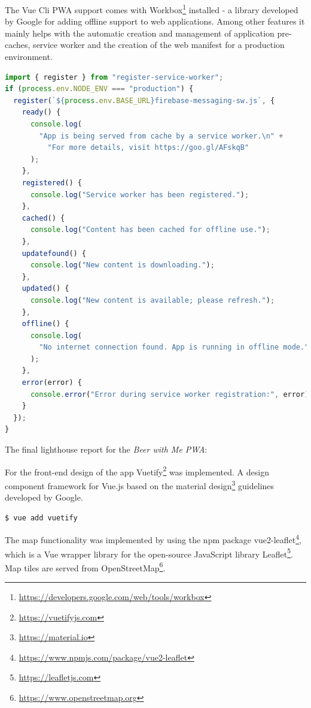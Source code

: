 
The Vue Cli PWA support comes with Workbox\footnote{\url{https://developers.google.com/web/tools/workbox}} installed - a library developed by Google for adding offline support to web applications. Among other features it mainly helps with the automatic creation and management of application pre-caches, service worker and the creation of the web manifest for a production environment.

\begin{lstlisting}[language=JavaScript, caption=registerServiceWorker.js: Workbox registering the service worker for production, label=lst:workbox]
import { register } from "register-service-worker";
if (process.env.NODE_ENV === "production") {
  register(`${process.env.BASE_URL}firebase-messaging-sw.js`, {
    ready() {
      console.log(
        "App is being served from cache by a service worker.\n" +
          "For more details, visit https://goo.gl/AFskqB"
      );
    },
    registered() {
      console.log("Service worker has been registered.");
    },
    cached() {
      console.log("Content has been cached for offline use.");
    },
    updatefound() {
      console.log("New content is downloading.");
    },
    updated() {
      console.log("New content is available; please refresh.");
    },
    offline() {
      console.log(
        "No internet connection found. App is running in offline mode."
      );
    },
    error(error) {
      console.error("Error during service worker registration:", error);
    }
  });
}
\end{lstlisting}

The final lighthouse report for the \textit{Beer with Me PWA}:

For the front-end design of the app Vuetify\footnote{\url{https://vuetifyjs.com}} was implemented. A design component framework for Vue.js based on the material design\footnote{\url{https://material.io}} guidelines developed by Google.

\begin{lstlisting}[language=bash, caption=Command to add Vuetify to the Vue.js project, label=lst:vuetify]
  $ vue add vuetify
\end{lstlisting}

The map functionality was implemented by using the npm package vue2-leaflet\footnote{\url{https://www.npmjs.com/package/vue2-leaflet}}, which is a Vue wrapper library for the open-source JavaScript library Leaflet\footnote{\url{https://leafletjs.com}}. Map tiles are served from OpenStreetMap\footnote{\url{https://www.openstreetmap.org}}.

